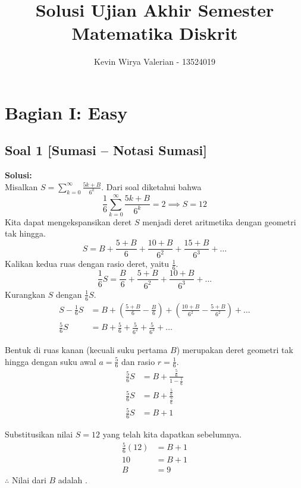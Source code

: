 \documentclass[12pt,a4paper]{article}
\title{\textbf{Solusi Ujian Akhir Semester\\Matematika Diskrit}}
\author{Kevin Wirya Valerian - 13524019}
\date{}
\begin{document}
\SetWatermarkText{}

\maketitle

\section*{Bagian I: Easy}

\subsection*{Soal 1 [Sumasi -- Notasi Sumasi]}
\textbf{Solusi:} \\
Misalkan $S = \sum_{k=0}^{\infty} \frac{5k + B}{6^k}$. Dari soal diketahui bahwa
\[ \frac{1}{6} \sum_{k=0}^{\infty} \frac{5k + B}{6^k} = 2 \implies S = 12 \]
Kita dapat mengekspansikan deret $S$ menjadi deret aritmetika dengan geometri tak hingga.
\[ S = B + \frac{5+B}{6} + \frac{10+B}{6^2} + \frac{15+B}{6^3} + \dots \]
Kalikan kedua ruas dengan rasio deret, yaitu $\frac{1}{6}$.
\[ \frac{1}{6} S = \frac{B}{6} + \frac{5+B}{6^2} + \frac{10+B}{6^3} + \dots \]
Kurangkan $S$ dengan $\frac{1}{6}S$.
\begin{align*}
    S - \frac{1}{6} S &= B + \left( \frac{5+B}{6} - \frac{B}{6} \right) + \left( \frac{10+B}{6^2} - \frac{5+B}{6^2} \right) + \dots \\
    \frac{5}{6} S &= B + \frac{5}{6} + \frac{5}{6^2} + \frac{5}{6^3} + \dots
\end{align*}

Bentuk di ruas kanan (kecuali suku pertama $B$) merupakan deret geometri tak hingga dengan suku awal $a = \frac{5}{6}$ dan rasio $r = \frac{1}{6}$.
\begin{align*}
    \frac{5}{6} S &= B + \frac{\frac{5}{6}}{1 - \frac{1}{6}} \\
    \frac{5}{6} S &= B + \frac{\frac{5}{6}}{\frac{5}{6}} \\
    \frac{5}{6} S &= B + 1
\end{align*}

Substitusikan nilai $S = 12$ yang telah kita dapatkan sebelumnya.
\begin{align*}
    \frac{5}{6} (12) &= B + 1 \\
    10 &= B + 1 \\
    B &= 9
\end{align*}
$\therefore$ Nilai dari $B$ adalah .
\end{document}
